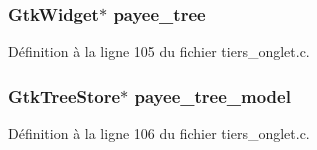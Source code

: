 \subsubsection[{payee\_\-tree}]{\setlength{\rightskip}{0pt plus 5cm}GtkWidget$\ast$ {\bf payee\_\-tree}}\label{utils__operations_8c_ab5b539c1af0cb10d03c328f20ecf23bf}


Définition à la ligne 105 du fichier tiers\_\-onglet.c.

\subsubsection[{payee\_\-tree\_\-model}]{\setlength{\rightskip}{0pt plus 5cm}GtkTreeStore$\ast$ {\bf payee\_\-tree\_\-model}}\label{utils__operations_8c_a1621c167eb13470254518b600d2983bf}


Définition à la ligne 106 du fichier tiers\_\-onglet.c.

